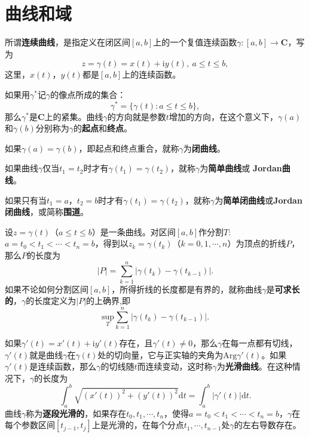 \documentclass[../../main.tex]{subfiles}
\begin{document}
\section{曲线和域}

\begin{definition}[连续曲线]
所谓\textbf{连续曲线}，是指定义在闭区间\([a, b]\)上的一个复值连续函数\(\gamma: [a, b] \to \mathbf{C}\)，写为
\[
z = \gamma(t) = x(t) + \mathrm{i}y(t), \ a \leqslant t \leqslant b,
\]
这里，\(x(t)\)，\(y(t)\)都是\([a, b]\)上的连续函数。

如果用\(\gamma^*\)记\(\gamma\)的像点所成的集合：
\[
\gamma^* = \{ \gamma(t) : a \leqslant t \leqslant b \},
\]
那么\(\gamma^*\)是\(\mathbf{C}\)上的紧集。曲线\(\gamma\)的方向就是参数\(t\)增加的方向，在这个意义下，\(\gamma(a)\)和\(\gamma(b)\)分别称为\(\gamma\)的\textbf{起点}和\textbf{终点}。

如果\(\gamma(a) = \gamma(b)\)，即起点和终点重合，就称\(\gamma\)为\textbf{闭曲线}。

如果曲线\(\gamma\)仅当\(t_1 = t_2\)时才有\(\gamma(t_1) = \gamma(t_2)\)，就称\(\gamma\)为\textbf{简单曲线}或 \textbf{Jordan曲线}。

如果只有当\(t_1 = a\)，\(t_2 = b\)时才有\(\gamma(t_1) = \gamma(t_2)\)，就称\(\gamma\)为\textbf{简单闭曲线}或\textbf{Jordan闭曲线}，或简称\textbf{围道}。
\end{definition}

\begin{definition}\label{definition:复平面上的光滑曲线}
设\(z = \gamma(t)\)（\(a \leqslant t \leqslant b\)）是一条曲线。对区间\([a, b]\)作分割$T:$ \(a = t_0 < t_1 < \cdots < t_n = b\)，得到以\(z_k = \gamma(t_k)\)（\(k = 0, 1, \cdots, n\)）为顶点的折线\(P\)，那么\(P\)的长度为
\[
|P| = \sum_{k = 1}^n | \gamma(t_k) - \gamma(t_{k - 1}) |.
\]
如果不论如何分割区间\([a, b]\)，所得折线的长度都是有界的，就称曲线\(\gamma\)是\textbf{可求长的}，\(\gamma\)的长度定义为\(|P|\)的上确界,即$$\underset{T}{\mathrm{sup}}\sum_{k=1}^n{|\gamma (t_k)}-\gamma (t_{k-1})|.$$

如果\(\gamma'(t) = x'(t) + \mathrm{i}y'(t)\)存在，且\(\gamma'(t) \neq 0\)，那么\(\gamma\)在每一点都有切线，\(\gamma'(t)\)就是曲线\(\gamma\)在\(\gamma(t)\)处的切向量，它与正实轴的夹角为\(\mathrm{Arg}\gamma'(t)\)。如果\(\gamma'(t)\)是连续函数，那么\(\gamma\)的切线随\(t\)而连续变动，这时称\(\gamma\)为\textbf{光滑曲线}。在这种情况下，\(\gamma\)的长度为
\[
\int_a^b \sqrt{(x'(t))^2 + (y'(t))^2} \mathrm{d}t = \int_a^b | \gamma'(t) | \mathrm{d}t.
\]
曲线\(\gamma\)称为\textbf{逐段光滑的}，如果存在\(t_0, t_1, \cdots, t_n\)，使得\(a = t_0 < t_1 < \cdots < t_n = b\)，\(\gamma\)在每个参数区间\([t_{j - 1}, t_j]\)上是光滑的，在每个分点\(t_1, \cdots, t_{n - 1}\)处\(\gamma\)的左右导数存在。
\end{definition}
\end{document}
